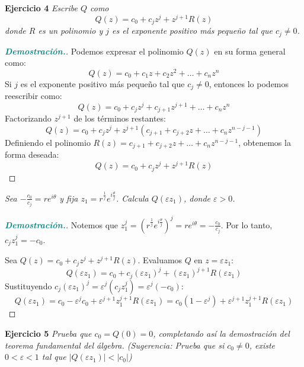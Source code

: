 \documentclass[12pt, letterpaper]{article}
\begin{document}
\vspace{0.4cm}
\noindent \textbf{Ejercicio 4} \textit{Escribe $Q$ como}
\[ Q(z) = c_0 + c_j z^j + z^{j+1} R(z) \]
\textit{donde $R$ es un polinomio y $j$ es el exponente positivo más pequeño tal que $c_j \neq 0$.}

\begin{proof}[\textbf{\textcolor{teal}{Demostración.}}]
    Podemos expresar el polinomio $Q(z)$ en su forma general como:
    \[ Q(z) = c_0 + c_1 z + c_2 z^2 + \dots + c_n z^n \]
    Si $j$ es el exponente positivo más pequeño tal que $c_j \neq 0$, entonces lo podemos reescribir como:
    \[ Q(z) = c_0 + c_j z^j + c_{j+1} z^{j+1} + \dots + c_n z^n \]
    Factorizando $z^{j+1}$ de los términos restantes:
    \[ Q(z) = c_0 + c_j z^j + z^{j+1} (c_{j+1} + c_{j+2} z + \dots + c_n z^{n-j-1}) \]
    Definiendo el polinomio $R(z) = c_{j+1} + c_{j+2} z + \dots + c_n z^{n-j-1}$, obtenemos la forma deseada:
    \[ Q(z) = c_0 + c_j z^j + z^{j+1} R(z) \]
\end{proof}

\vspace{0.4cm}
\noindent \textit{Sea $-\frac{c_0}{c_j} = r e^{i\theta}$ y fija $z_1 = r^{\frac{1}{j}} e^{i \frac{\theta}{j}}$. Calcula $Q(\varepsilon z_1)$, donde $\varepsilon > 0$.}

\begin{proof}[\textbf{\textcolor{teal}{Demostración.}}]
    Notemos que $z_1^j = \left( r^{\frac{1}{j}} e^{i \frac{\theta}{j}} \right)^j = r e^{i\theta} = -\frac{c_0}{c_j}$. Por lo tanto, $c_j z_1^j = -c_0$.
    
    Sea $Q(z) = c_0 + c_j z^j + z^{j+1} R(z)$. Evaluamos $Q$ en $z = \varepsilon z_1$:
    \[ Q(\varepsilon z_1) = c_0 + c_j (\varepsilon z_1)^j + (\varepsilon z_1)^{j+1} R(\varepsilon z_1) \]
    Sustituyendo $c_j (\varepsilon z_1)^j = \varepsilon^j (c_j z_1^j) = \varepsilon^j (-c_0)$:
    \[ Q(\varepsilon z_1) = c_0 - \varepsilon^j c_0 + \varepsilon^{j+1} z_1^{j+1} R(\varepsilon z_1) = c_0 (1 - \varepsilon^j) + \varepsilon^{j+1} z_1^{j+1} R(\varepsilon z_1) \]
\end{proof}

\vspace{0.4cm}
\noindent \textbf{Ejercicio 5} \textit{Prueba que $c_0 = Q(0) = 0$, completando así la demostración del teorema fundamental del álgebra. (Sugerencia: Prueba que si $c_0 \neq 0$, existe $0 < \varepsilon < 1$ tal que $|Q(\varepsilon z_1)| < |c_0|$)}
\end{document}
